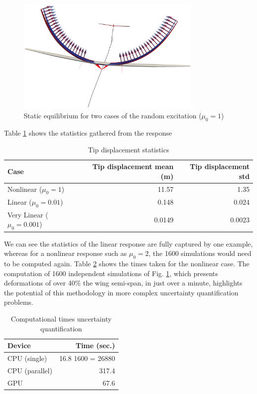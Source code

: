 \documentclass[11pt]{article}
\begin{document}
\begin{figure}[htbp]
\centering
\includegraphics[width=0.8\textwidth]{figs_ext/MC1.png}
\caption{\label{fig:org5298a7f}Static equilibrium for two cases of the random excitation (\(\mu_0=1\))}
\end{figure}

Table \ref{tab:org4a9ec01} shows the statistics gathered from the response
\begin{table}[htbp]
\caption{\label{tab:org4a9ec01}Tip displacement statistics}
\centering
\begin{tabular}{lrr}
Case & Tip displacement mean (m) & Tip displacement std\\[0pt]
\hline
Nonlinear (\(\mu_0 = 1\)) & 11.57 & 1.35\\[0pt]
Linear (\(\mu_0 = 0.01\)) & 0.148 & 0.024\\[0pt]
Very Linear (\(\mu_0 = 0.001\)) & 0.0149 & 0.0023\\[0pt]
\end{tabular}
\end{table}

We can see the statistics of the linear response are fully captured by one example, whereas for a nonlinear response such as \(\mu_0 = 2\), the 1600 simulations would need to be computed again. Table \ref{tab:orgb9e277e} shows the times taken for the nonlinear case. The computation of 1600 independent simulations of Fig. \ref{fig:org5298a7f}, which presents deformations of over 40\% the wing semi-span, in just over a minute, highlights the potential of this methodology in more complex uncertainty quantification problems.  

\begin{table}[htbp]
\caption{\label{tab:orgb9e277e}Computational times uncertainty quantification}
\centering
\begin{tabular}{lr}
Device & Time (sec.)\\[0pt]
\hline
CPU (single) & 16.8 \texttimes{} 1600 = 26880\\[0pt]
CPU (parallel) & 317.4\\[0pt]
GPU & 67.6\\[0pt]
\end{tabular}
\end{table}
\end{document}
